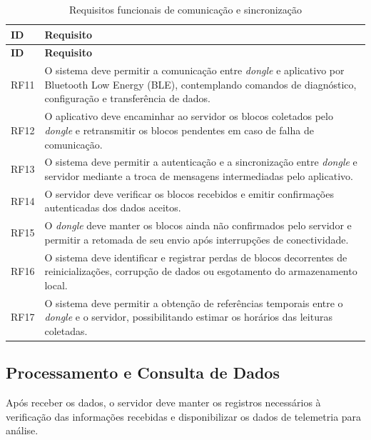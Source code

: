 \begin{longtable}{p{}p{}}
\caption{Requisitos funcionais de comunicação e sincronização}
\label{tab:rf-sincronizacao}\\
\hline
\textbf{ID} & \textbf{Requisito} \\
\hline
\endfirsthead

\hline
\textbf{ID} & \textbf{Requisito} \\
\hline
\endhead

RF11 & O sistema deve permitir a comunicação entre \textit{dongle} e
aplicativo por Bluetooth Low Energy (BLE), contemplando
comandos de diagnóstico, configuração e transferência
de dados. \\

RF12 & O aplicativo deve encaminhar ao servidor os blocos
coletados pelo \textit{dongle} e retransmitir os blocos pendentes
em caso de falha de comunicação. \\

RF13 & O sistema deve permitir a autenticação e a sincronização
entre \textit{dongle} e servidor mediante a troca de mensagens
intermediadas pelo aplicativo. \\

RF14 & O servidor deve verificar os blocos recebidos e emitir
confirmações autenticadas dos dados aceitos. \\

RF15 & O \textit{dongle} deve manter os blocos ainda não confirmados
pelo servidor e permitir a retomada de seu envio após
interrupções de conectividade. \\

RF16 & O sistema deve identificar e registrar perdas de blocos
decorrentes de reinicializações, corrupção de dados ou
esgotamento do armazenamento local. \\

RF17 & O sistema deve permitir a obtenção de referências
temporais entre o \textit{dongle} e o servidor, possibilitando
estimar os horários das leituras coletadas. \\

\hline
\end{longtable}


\subsection{Processamento e Consulta de Dados}

Após receber os dados, o servidor deve manter os registros necessários à verificação das informações recebidas e disponibilizar os dados de telemetria para análise.



